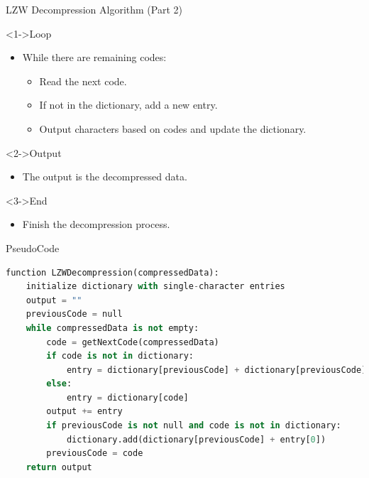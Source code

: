 \documentclass{beamer}
\begin{document}
\begin{frame}{LZW Decompression Algorithm (Part 2)}
    \begin{block}<1->{Loop}
        \begin{itemize}
            \item While there are remaining codes:
            \begin{itemize}
                \item Read the next code.
                \item If not in the dictionary, add a new entry.
                \item Output characters based on codes and update the dictionary.
            \end{itemize}
        \end{itemize}
    \end{block}
    
    \begin{block}<2->{Output}
        \begin{itemize}
            \item The output is the decompressed data.
        \end{itemize}
    \end{block}
    
    \begin{block}<3->{End}
        \begin{itemize}
            \item Finish the decompression process.
        \end{itemize}
    \end{block}
\end{frame}
\begin{frame}[fragile]{PseudoCode}
\begin{lstlisting}[language=Python, basicstyle=\small]
function LZWDecompression(compressedData):
    initialize dictionary with single-character entries
    output = ""
    previousCode = null
    while compressedData is not empty:
        code = getNextCode(compressedData)
        if code is not in dictionary:
            entry = dictionary[previousCode] + dictionary[previousCode][0]
        else:
            entry = dictionary[code]
        output += entry
        if previousCode is not null and code is not in dictionary:
            dictionary.add(dictionary[previousCode] + entry[0])
        previousCode = code
    return output
\end{lstlisting}
\end{frame}
\end{document}
